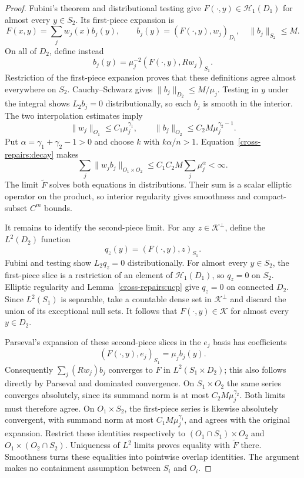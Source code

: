 \documentclass[11pt]{article}
\theoremstyle{definition}
\theoremstyle{remark}
\numberwithin{equation}{section}
\begin{document}
\begin{proof}
Fubini's theorem and distributional testing give
$F(\cdot,y)\in\mathcal H_1(D_1)$ for almost every $y\in S_2$.
Its first-piece expansion is
\[
 F(x,y)=\sum_jw_j(x)b_j(y),\qquad
 b_j(y)=(F(\cdot,y),w_j)_{D_1},\quad
 \|b_j\|_{S_2}\le M.
\]
On all of $D_2$, define instead
\begin{equation}\label{cross-repairs:coefficients}
 b_j(y)=\mu_j^{-2}(F(\cdot,y),Rw_j)_{S_1}.
\end{equation}
Restriction of the first-piece expansion proves that these definitions
agree almost everywhere on $S_2$. Cauchy--Schwarz gives
$\|b_j\|_{D_2}\le M/\mu_j$. Testing in $y$ under the integral shows
$L_2b_j=0$ distributionally, so each $b_j$ is smooth in the interior.
The two interpolation estimates imply
\[
 \|w_j\|_{O_1}\le C_1\mu_j^{\gamma_1},\qquad
 \|b_j\|_{O_2}\le C_2M\mu_j^{\gamma_2-1}.
\]
Put $\alpha=\gamma_1+\gamma_2-1>0$ and choose $k$ with $k\alpha/n>1$.
Equation~\eqref{cross-repairs:decay} makes
\[
 \sum_j\|w_jb_j\|_{O_1\times O_2}
 \le C_1C_2M\sum_j\mu_j^\alpha<\infty.
\]
The limit $\widetilde F$ solves both equations in distributions.
Their sum is a scalar elliptic operator on the product, so interior
regularity gives smoothness and compact-subset $C^m$ bounds.

It remains to identify the second-piece limit. For any
$z\in\mathcal K^\perp$, define the $L^2(D_2)$ function
\[
 q_z(y)=(F(\cdot,y),z)_{S_1}.
\]
Fubini and testing show $L_2q_z=0$ distributionally.
For almost every $y\in S_2$, the first-piece slice is a restriction of
an element of $\mathcal H_1(D_1)$, so $q_z=0$ on $S_2$.
Elliptic regularity and Lemma~\ref{cross-repairs:ucp} give $q_z=0$ on
connected $D_2$. Since $L^2(S_1)$ is separable, take a countable dense
set in $\mathcal K^\perp$ and discard the union of its exceptional
null sets. It follows that
$F(\cdot,y)\in\mathcal K$ for almost every $y\in D_2$.

Parseval's expansion of these second-piece slices in the $e_j$ basis has
coefficients
\[
 (F(\cdot,y),e_j)_{S_1}=\mu_jb_j(y).
\]
Consequently $\sum_j(Rw_j)b_j$ converges to $F$ in
$L^2(S_1\times D_2)$; this also follows directly by Parseval and
dominated convergence. On $S_1\times O_2$ the same series converges
absolutely, since its summand norm is at most $C_2M\mu_j^{\gamma_2}$.
Both limits must therefore agree. On $O_1\times S_2$, the first-piece
series is likewise absolutely convergent, with summand norm at most
$C_1M\mu_j^{\gamma_1}$, and agrees with the original expansion.
Restrict these identities respectively to
$(O_1\cap S_1)\times O_2$ and
$O_1\times(O_2\cap S_2)$. Uniqueness of $L^2$ limits proves equality
with $\widetilde F$ there. Smoothness turns these equalities into
pointwise overlap identities. The argument makes no containment
assumption between $S_i$ and $O_i$.
\end{proof}
\end{document}
